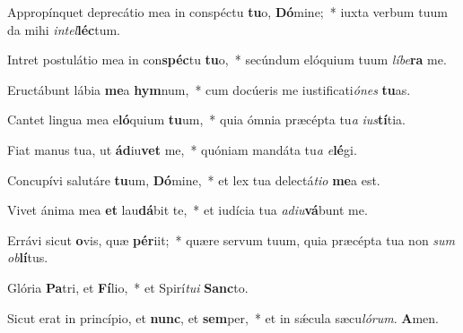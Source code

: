 \item Appropínquet deprecátio mea in conspéctu \textbf{tu}o, \textbf{Dó}mine;~* iuxta verbum tuum da mihi \textit{intel}\textbf{léc}tum.

\item Intret postulátio mea in con\textbf{spéc}tu \textbf{tu}o,~* secúndum elóquium tuum \textit{líbe}\textbf{ra} me.

\item Eructábunt lábia \textbf{me}a \textbf{hym}num,~* cum docúeris me iustificati\textit{ónes} \textbf{tu}as.

\item Cantet lingua mea e\textbf{ló}quium \textbf{tu}um,~* quia ómnia præcépta tu\textit{a} \textit{ius}\textbf{tí}tia.

\item Fiat manus tua, ut \textbf{ád}iu\textbf{vet} me,~* quóniam mandáta tu\textit{a} \textit{e}\textbf{lé}gi.

\item Concupívi salutáre \textbf{tu}um, \textbf{Dó}mine,~* et lex tua delectá\textit{tio} \textbf{me}a est.

\item Vivet ánima mea \textbf{et} lau\textbf{dá}bit te,~* et iudícia tua \textit{adiu}\textbf{vá}bunt me.

\item Errávi sicut \textbf{o}vis, quæ \textbf{pér}iit;~* quære servum tuum, quia præcépta tua non \textit{sum} \textit{ob}\textbf{lí}tus.

\item Glória \textbf{Pa}tri, et \textbf{Fí}lio,~* et Spirí\textit{tui} \textbf{Sanc}to.

\item Sicut erat in princípio, et \textbf{nunc}, et \textbf{sem}per,~* et in sǽcula sæcu\textit{lórum}. \textbf{A}men.